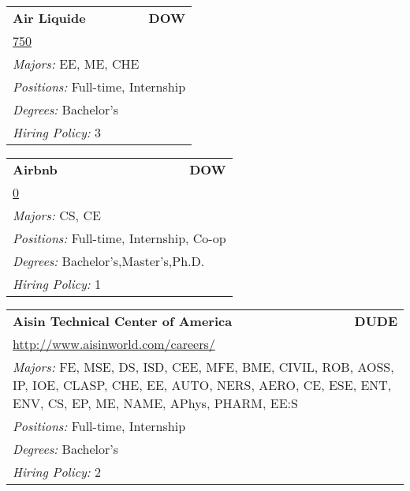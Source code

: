 \documentclass[twoside]{article}
\begin{document}
\begin{center}
\begin{multicols}{3}
\begin{FlushLeft}
\begin{minipage}{\columnwidth}
\end{minipage}
 
\begin{minipage}{\columnwidth}\begin{tabularx}{.95\columnwidth}{Xr}
                 {\Large\bf Air Liquide} & {\Large\bf DOW}\\
    \multicolumn{2}{p{.95\columnwidth}}{\url{750}}\\
    \multicolumn{2}{p{.95\columnwidth}}{\emph{Majors:} EE, ME, CHE}\\
    \multicolumn{2}{p{.95\columnwidth}}{\emph{Positions:} Full-time, Internship}\\
    \multicolumn{2}{p{.95\columnwidth}}{\emph{Degrees:} Bachelor's}\\
    \multicolumn{2}{p{.95\columnwidth}}{\emph{Hiring Policy:} 3}\\
    \end{tabularx}
    
\end{minipage}
 
\begin{minipage}{\columnwidth}\begin{tabularx}{.95\columnwidth}{Xr}
                 {\Large\bf Airbnb} & {\Large\bf DOW}\\
    \multicolumn{2}{p{.95\columnwidth}}{\url{0}}\\
    \multicolumn{2}{p{.95\columnwidth}}{\emph{Majors:} CS, CE}\\
    \multicolumn{2}{p{.95\columnwidth}}{\emph{Positions:} Full-time, Internship, Co-op}\\
    \multicolumn{2}{p{.95\columnwidth}}{\emph{Degrees:} Bachelor's,Master's,Ph.D.}\\
    \multicolumn{2}{p{.95\columnwidth}}{\emph{Hiring Policy:} 1}\\
    \end{tabularx}
    
\end{minipage}
 
\begin{minipage}{\columnwidth}\begin{tabularx}{.95\columnwidth}{Xr}
                 {\Large\bf Aisin Technical Center of America} & {\Large\bf DUDE}\\
    \multicolumn{2}{p{.95\columnwidth}}{\url{http://www.aisinworld.com/careers/}}\\
    \multicolumn{2}{p{.95\columnwidth}}{\emph{Majors:} FE, MSE, DS, ISD, CEE, MFE, BME, CIVIL, ROB, AOSS, IP, IOE, CLASP, CHE, EE, AUTO, NERS, AERO, CE, ESE, ENT, ENV, CS, EP, ME, NAME, APhys, PHARM, EE:S}\\
    \multicolumn{2}{p{.95\columnwidth}}{\emph{Positions:} Full-time, Internship}\\
    \multicolumn{2}{p{.95\columnwidth}}{\emph{Degrees:} Bachelor's}\\
    \multicolumn{2}{p{.95\columnwidth}}{\emph{Hiring Policy:} 2}\\
    \end{tabularx}
    

\end{minipage}
\end{FlushLeft}
\end{multicols}
\end{center}
\end{document}
